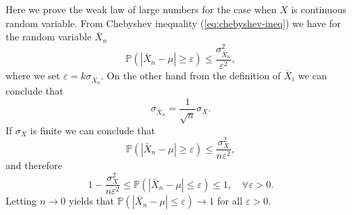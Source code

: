 \documentclass[11pt]{article}
\newcommand{\Pro}{\mathbb{P}}
\begin{document}
Here we prove the weak law of large numbers for the case when $X$ is
continuous random variable. From Chebyshev inequality
(\ref{eq:chebyshev-ineq}) we have for the random variable $\bar{X}_n$
\begin{equation} 
  \Pro(|\bar{X}_n-\mu| \geq \varepsilon) \leq
  \frac{\sigma_{\bar{X}_n}^2}{\varepsilon^2},
\end{equation}
where we set $\varepsilon = k \sigma_{\bar{X}_n}$. On the other hand
from the definition of $\bar{X}_i$ we can conclude that
\begin{equation*}
  \sigma_{\bar{X}_n} = \frac{1}{\sqrt{n}} \sigma_X.
\end{equation*}
If $\sigma_X$ is finite we can conclude that 
\begin{equation*} 
  \Pro(|\bar{X}_n-\mu| \geq \varepsilon) \leq
  \frac{\sigma_{X}^2}{n \varepsilon^2},
\end{equation*}
and therefore
\begin{equation} 
  1- \frac{\sigma_{X}^2}{n \varepsilon^2} \leq
  \Pro(|\bar{X}_n-\mu| \leq \varepsilon) \leq
  1, \quad \forall \varepsilon > 0.
\end{equation}
Letting $n \rightarrow 0$ yields that $ \Pro(|\bar{X}_n-\mu| \leq
\varepsilon) \rightarrow 1$ for all $\varepsilon > 0$.
\end{document}
